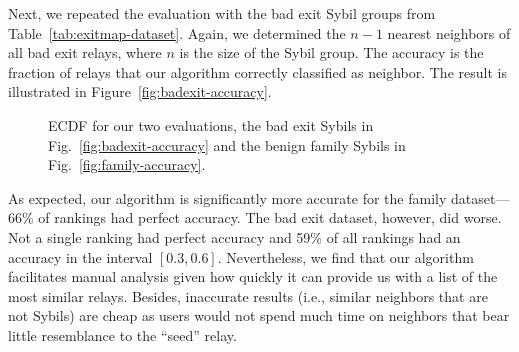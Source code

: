 Next, we repeated the evaluation with the bad exit Sybil groups from
Table~\ref{tab:exitmap-dataset}.  Again, we determined the $n - 1$ nearest
neighbors of all bad exit relays, where $n$ is the size of the Sybil group.
The accuracy is the fraction of relays that our algorithm correctly classified
as neighbor.  The result is illustrated in Figure~\ref{fig:badexit-accuracy}.

\begin{figure}
\centering
{}
\caption{ECDF for our two evaluations, the bad exit Sybils
	in Fig.~\ref{fig:badexit-accuracy} and the benign family Sybils
	in Fig.~\ref{fig:family-accuracy}.}
\label{fig:accuracy}
\end{figure}

As expected, our algorithm is significantly more accurate for the family
dataset---66\% of rankings had perfect accuracy.  The bad exit dataset,
however, did worse.  Not a single ranking had perfect accuracy and 59\% of all
rankings had an accuracy in the interval $[0.3,0.6]$.  Nevertheless, we find
that our algorithm facilitates manual analysis given how quickly it can provide
us with a list of the most similar relays.  Besides, inaccurate results (i.e.,
similar neighbors that are not Sybils) are cheap as \sys users would not spend
much time on neighbors that bear little resemblance to the ``seed'' relay.

